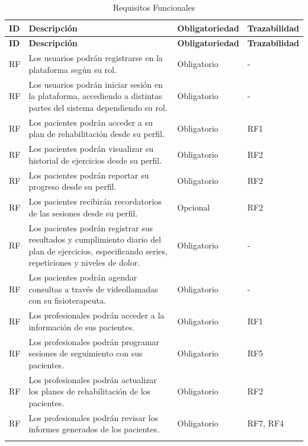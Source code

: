 \documentclass{article}
\begin{document}
\begin{longtable}{@{} p{2.5cm} p{6.5cm} p{3cm} p{3cm} @{}}
	\caption{Requisitos Funcionales}\\
	\toprule
	\textbf{ID} & \textbf{Descripción} & \textbf{Obligatoriedad} & \textbf{Trazabilidad} \\
	\midrule
	\endfirsthead
	
	\toprule
	\textbf{ID} & \textbf{Descripción} & \textbf{Obligatoriedad} & \textbf{Trazabilidad} \\
	\midrule
	\endhead
	
	\addlinespace 
	RF\therequisitosFuncionales & Los usuarios podrán registrarse en la plataforma según su rol. & Obligatorio & - \\
	\addlinespace \stepcounter{requisitosFuncionales}
	RF\therequisitosFuncionales & Los usuarios podrán iniciar sesión en la plataforma, accediendo a distintas partes del sistema dependiendo su rol. & Obligatorio & - \\  
	\addlinespace \stepcounter{requisitosFuncionales}
	RF\therequisitosFuncionales & Los pacientes podrán acceder a su plan de rehabilitación desde su perfil. & Obligatorio & RF1\\ 
	\addlinespace \stepcounter{requisitosFuncionales}
	RF\therequisitosFuncionales & Los pacientes podrán visualizar su historial de ejercicios desde su perfil. & Obligatorio & RF2 \\ 
	\addlinespace \stepcounter{requisitosFuncionales}
	RF\therequisitosFuncionales & Los pacientes podrán reportar su progreso desde su perfil. & Obligatorio & RF2 \\ 
	\addlinespace \stepcounter{requisitosFuncionales}
	RF\therequisitosFuncionales & Los pacientes recibirán recordatorios de las sesiones desde su perfil. & Opcional & RF2 \\
	\addlinespace \stepcounter{requisitosFuncionales}
	RF\therequisitosFuncionales & Los pacientes podrán registrar sus resultados y cumplimiento diario del plan de ejercicios, especificando series, repeticiones y niveles de dolor. & Obligatorio & - \\ 
	RF\therequisitosFuncionales & Los pacientes podrán agendar consultas a través de videollamadas con su fisioterapeuta. & Obligatorio & - \\
	\addlinespace \stepcounter{requisitosFuncionales}
	RF\therequisitosFuncionales & Los profesionales podrán acceder a la información de sus pacientes. & Obligatorio & RF1 \\ 
	\addlinespace \stepcounter{requisitosFuncionales}
	RF\therequisitosFuncionales & Los profesionales podrán programar sesiones de seguimiento con sus pacientes. & Obligatorio & RF5 \\ 
	\addlinespace \stepcounter{requisitosFuncionales}
	RF\therequisitosFuncionales & Los profesionales podrán actualizar los planes de rehabilitación de los pacientes. & Obligatorio & RF2 \\ 
	\addlinespace \stepcounter{requisitosFuncionales}
	RF\therequisitosFuncionales & Los profesionales podrán revisar los informes generados de los pacientes. & Obligatorio & RF7, RF4\\ 
	\addlinespace \stepcounter{requisitosFuncionales}
	 


\end{longtable}
\end{document}
